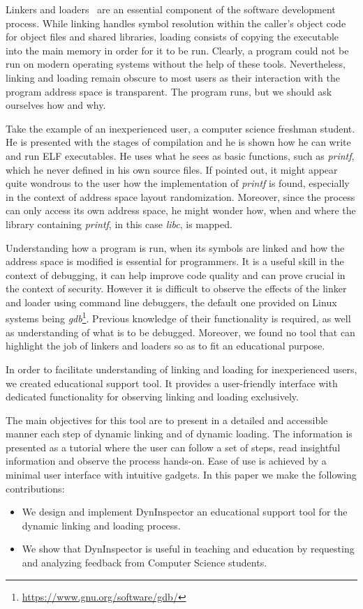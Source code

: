 Linkers and loaders~\cite{linkers-and-loaders} are an essential component of the software development process. While linking handles symbol resolution within the caller’s object code for object files and shared libraries, loading consists of copying the executable into the main memory in order for it to be run. Clearly, a program could not be run on modern operating systems without the help of these tools. Nevertheless, linking and loading remain obscure to most users as their interaction with the program address space is transparent. The program runs, but we should ask ourselves how and why.

Take the example of an inexperienced user, a computer science freshman student. He is presented with the stages of compilation and he is shown how he can write and run ELF executables. He uses what he sees as basic functions, such as \textit{printf}, which he never defined in his own source files. If pointed out, it might appear quite wondrous to the user how the implementation of \textit{printf} is found, especially in the context of address space layout randomization. Moreover, since the process can only access its own address space, he might wonder how, when and where the library containing \textit{printf}, in this case \textit{libc}, is mapped.

Understanding how a program is run, when its symbols are linked and how the address space is modified is essential for programmers. It is a useful skill in the context of debugging, it can help improve code quality and can prove crucial in the context of security. However it is difficult to observe the effects of the linker and loader using command line debuggers, the default one provided on Linux systems being \textit{gdb}\footnote{\url{https://www.gnu.org/software/gdb/}}. Previous knowledge of their functionality is required, as well as understanding of what is to be debugged. Moreover, we found no tool that can highlight the job of linkers and loaders so as to fit an educational purpose.

In order to facilitate understanding of linking and loading for inexperienced users, we created educational support tool. It provides a user-friendly interface with dedicated functionality for observing linking and loading exclusively.

The main objectives for this tool are to present in a detailed and accessible manner each step of dynamic linking and of dynamic loading. The information is presented as a tutorial where the user can follow a set of steps, read insightful information and observe the process hands-on. Ease of use is achieved by a minimal user interface with intuitive gadgets. In this paper we make the following contributions:
\begin{itemize}
  \item We design and implement DynInspector an educational support tool for the dynamic linking and loading process.
  \item We show that DynInspector is useful in teaching and education by requesting and analyzing feedback from Computer Science students.
\end{itemize}
